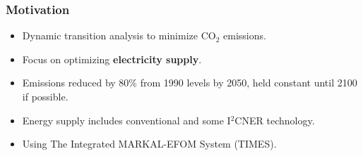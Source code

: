 
\begin{frame}
  \frametitle{Motivation}
   \begin{itemize}
   
   \item Dynamic transition analysis to minimize CO$_2$ emissions.
   
   \item Focus on optimizing \textbf{electricity supply}.
   
   \item Emissions reduced by 80\% from 1990 levels by 2050, held constant until 2100 if possible.
   
   \item Energy supply includes conventional and some I$^2$CNER technology.
   
   \item Using The Integrated MARKAL-EFOM System (TIMES).
   \end{itemize}
%
        
\end{frame}
